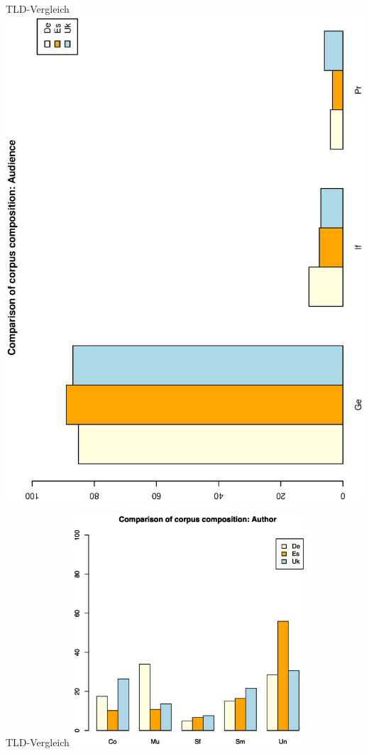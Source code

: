 \begin{frame}
  {TLD-Vergleich}
  \centering
  \includegraphics[height=0.95\textheight,angle=270]{graphics/aud}
\end{frame}

\begin{frame}
  {TLD-Vergleich}
  \centering
  \includegraphics[width=0.65\textwidth]{graphics/aut}
\end{frame}

